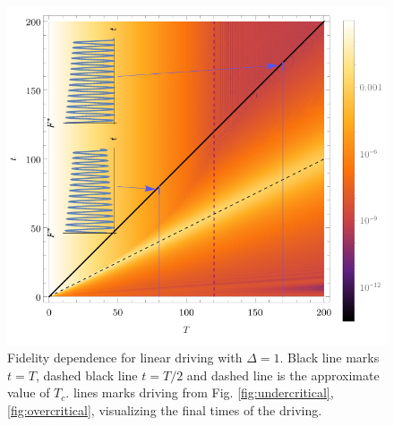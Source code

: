 \begin{figure}[H]
    \centering 
    \includegraphics[scale=1.2]{../img/allInOne.pdf}
    \caption{Fidelity dependence for linear driving with $\Delta=1$. Black line marks $t=T$, dashed black line $t=T/2$ and  dashed line is the approximate value of $T_c$.  lines marks driving from Fig. \ref{fig:undercritical}, \ref{fig:overcritical}, visualizing the final times of the driving.}
    \label{fig:AllInOne}
\end{figure}


\newpage
